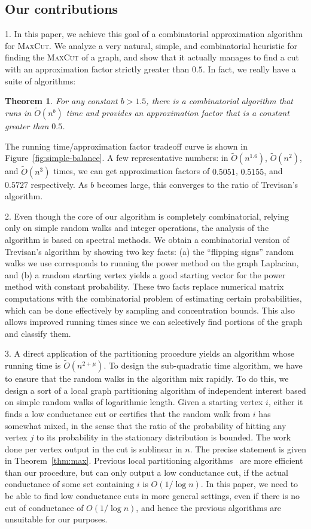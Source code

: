 \documentclass[11pt]{article}
\newtheorem{theorem}{Theorem}[section]
\newcommand\otilde{\widetilde{O}}
\def\maxcut{\textsc{MaxCut}\xspace}
\begin{document}
\subsection{Our contributions}

1. In this paper, we achieve this goal of a combinatorial approximation
algorithm for \maxcut. We analyze a very natural, simple, and combinatorial
heuristic for finding the \maxcut of a graph, and show that it actually manages
to find a cut with an approximation factor strictly greater than $0.5$. In fact, we really
have a suite of algorithms:
\begin{theorem} \label{thm:main}
For any constant $b > 1.5$, there is a combinatorial algorithm
that runs in $\otilde(n^b)$ time and provides
an approximation factor that is a constant greater than $0.5$.
\end{theorem}
The running time/approximation factor tradeoff curve is
shown in Figure~\ref{fig:simple-balance}. A few representative numbers: in
$\otilde(n^{1.6})$, $\otilde(n^2)$, and $\otilde(n^3)$ times, we can get
approximation factors of $0.5051$, $0.5155$, and $0.5727$ respectively. As $b$
becomes large, this converges to the ratio of Trevisan's algorithm.


2. Even though the core of our algorithm is completely combinatorial, relying only on simple random walks and integer operations, the analysis of the algorithm is based on spectral methods. We obtain a combinatorial version of Trevisan's algorithm by showing two key facts: (a) the ``flipping signs'' random walks we use corresponds to running the power method on the graph Laplacian, and (b) a random starting vertex yields a good starting vector for the power method with constant probability. These two facts replace numerical matrix computations with the combinatorial problem of estimating certain probabilities, which can be done effectively by sampling and concentration bounds. This also allows improved running times since we can selectively find portions of the graph and classify them.

3. A direct application of the partitioning procedure yields an algorithm whose running time is $\otilde(n^{2+\mu})$. To design the sub-quadratic time algorithm, we have to ensure that the random walks in the algorithm mix rapidly. To do this, we design a sort of a local graph partitioning algorithm of independent interest based on simple random walks of logarithmic length. Given a starting vertex $i$,
either it finds a low conductance cut or certifies that the random walk from $i$ has somewhat mixed, in the sense that the ratio of the probability of hitting any vertex $j$ to its probability in the stationary distribution is bounded. The work done per vertex output in the cut is sublinear in $n$. The precise statement is given in Theorem~\ref{thm:max}.
Previous local partitioning algorithms~\cite{ST04, ACL06, AL08} are more efficient than our procedure, but
can only output a low conductance cut, if the actual conductance of some set containing $i$ is $O(1/\log n)$.
In this paper, we need to be able to find low conductance cuts in more general settings, even if there is no cut of conductance of $O(1/\log n)$, and hence the previous algorithms are unsuitable for our purposes.
\end{document}
